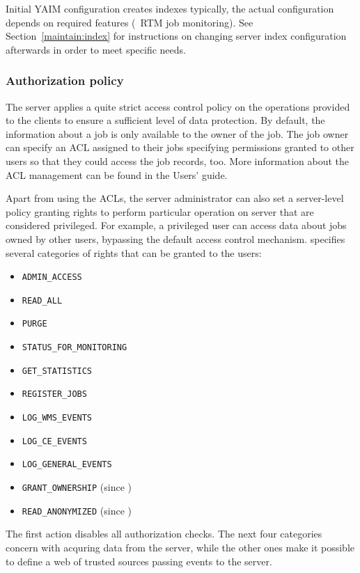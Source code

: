 Initial YAIM configuration creates \LB indexes typically,
the actual configuration depends on required features (\eg\ RTM job monitoring).
See Section~\ref{maintain:index} for instructions
on changing \LB server index configuration afterwards in order
to meet specific needs.

\subsubsection{Authorization policy}
\label{inst:authz}
The \LB server applies a quite strict access control policy on the
operations provided to the clients to ensure a sufficient level of data
protection. By default, the information about a job is only available to the
owner of the job. The job owner can specify an ACL assigned to their jobs
specifying permissions granted to other users so that they could access the
job records, too. More information about the ACL management can be found in
the \LB Users' guide.

Apart from using the ACLs, the \LB server administrator can also set a
server-level policy granting rights to perform particular operation on \LB
server that are considered privileged.
For example, a privileged
user can access data about jobs owned by other users, bypassing the default
\LB access control mechanism.  specifies several categories of
rights that can be granted to the users:

\begin{itemize}
\item \verb'ADMIN_ACCESS'
\item \verb'READ_ALL'
\item \verb'PURGE'
\item \verb'STATUS_FOR_MONITORING'
\item \verb'GET_STATISTICS'
\item \verb'REGISTER_JOBS'
\item \verb'LOG_WMS_EVENTS'
\item \verb'LOG_CE_EVENTS'
\item \verb'LOG_GENERAL_EVENTS'
\item \verb'GRANT_OWNERSHIP' (since )
\item \verb'READ_ANONYMIZED' (since )
\end{itemize}

The first action disables all authorization checks. The next four categories concern with acquring data from the \LB
server, while the other ones make it possible to define a web of trusted sources
passing events to the \LB server.

